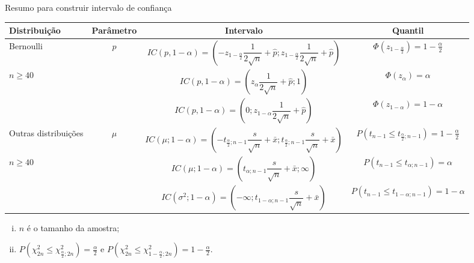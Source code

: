 \documentclass[8pt]{beamer}
\begin{document}
\begin{frame}{Resumo para construir intervalo de confiança}

{\tiny
	
	\begin{table}[htbp]
		\centering
		\begin{tabular}{l|c|c|c}
			\toprule[0.05cm]
			Distribuição & Parâmetro & Intervalo  & Quantil \\ \midrule[0.05cm]
			Bernoulli  & $p$ & $IC(p, 1-\alpha) = \left( -z_{1-\frac{\alpha}{2}}\dfrac{1}{2\sqrt{n}} + \hat{p}; z_{1-\frac{\alpha}{2}}\dfrac{1}{2\sqrt{n}} + \hat{p} \right)$  & $\Phi\left( z_{1-\frac{\alpha}{2}} \right) = 1 - \frac{\alpha}{2}$ \\ 
			$n \geq 40$ &  & $IC(p, 1-\alpha) = \left( z_{\alpha} \dfrac{1}{2 \sqrt{n}} + \hat{p}; 1 \right)$  & $\Phi\left( z_\alpha \right) = \alpha$ \\ 
			&  & $IC(p, 1-\alpha) = \left( 0; z_{1-\alpha} \dfrac{1}{2 \sqrt{n}} + \hat{p} \right)$  & $\Phi\left( z_{1-\alpha} \right) = 1 - \alpha$ \\ \midrule
			Outras distribuições & $\mu$ & $IC(\mu; 1-\alpha) = \left( -t_{\frac{\alpha}{2}; n-1} \dfrac{s}{\sqrt{n}} + \bar{x}; t_{\frac{\alpha}{2}; n-1} \dfrac{s}{\sqrt{n}} + \bar{x} \right)$  & $P\left( t_{n-1} \leq t_{\frac{\alpha}{2}; n-1} \right) = 1- \frac{\alpha}{2}$  \\ 
			$n \geq 40$ &  & $IC(\mu; 1-\alpha) = \left(t_{\alpha; n-1} \dfrac{s}{\sqrt{n}} + \bar{x}; \infty  \right)$  & $P\left( t_{n-1} \leq t_{\alpha; n-1} \right) = \alpha$ \\ 
			&  & $IC(\sigma^2; 1-\alpha) = \left(-\infty; t_{1-\alpha; n-1} \dfrac{s}{\sqrt{n}} + \bar{x} \right)$  & $P\left( t_{n-1} \leq t_{1-\alpha; n-1} \right) = 1 - \alpha$ \\ \bottomrule[0.05cm]
		\end{tabular}
	\end{table}
	\begin{enumerate}[i.]
		\item $n$ é o tamanho da amostra;
		\item $P\left( \chi^2_{2n} \leq \chi^2_{\frac{\alpha}{2};2n} \right) = \frac{\alpha}{2}$ e $P\left( \chi^2_{2n} \leq \chi^2_{1-\frac{\alpha}{2};2n} \right) = 1- \frac{\alpha}{2}$.
	\end{enumerate}
}


\end{frame}
\end{document}
